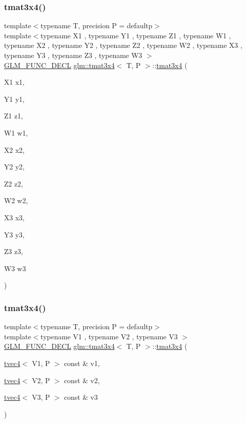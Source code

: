 \subsubsection{\texorpdfstring{tmat3x4()}{tmat3x4()}\hspace{0.1cm}{\footnotesize\ttfamily [8/22]}}
{\footnotesize\ttfamily template$<$typename T, precision P = defaultp$>$ \\
template$<$typename X1 , typename Y1 , typename Z1 , typename W1 , typename X2 , typename Y2 , typename Z2 , typename W2 , typename X3 , typename Y3 , typename Z3 , typename W3 $>$ \\
\mbox{\hyperlink{setup_8hpp_ab2d052de21a70539923e9bcbf6e83a51}{G\+L\+M\+\_\+\+F\+U\+N\+C\+\_\+\+D\+E\+CL}} \mbox{\hyperlink{structglm_1_1tmat3x4}{glm\+::tmat3x4}}$<$ T, P $>$\+::\mbox{\hyperlink{structglm_1_1tmat3x4}{tmat3x4}} (\begin{DoxyParamCaption}\item[{X1}]{x1,  }\item[{Y1}]{y1,  }\item[{Z1}]{z1,  }\item[{W1}]{w1,  }\item[{X2}]{x2,  }\item[{Y2}]{y2,  }\item[{Z2}]{z2,  }\item[{W2}]{w2,  }\item[{X3}]{x3,  }\item[{Y3}]{y3,  }\item[{Z3}]{z3,  }\item[{W3}]{w3 }\end{DoxyParamCaption})}

\mbox{\label{structglm_1_1tmat3x4_a79898618d22d01dd865e88d61aaf9016}} 
\subsubsection{\texorpdfstring{tmat3x4()}{tmat3x4()}\hspace{0.1cm}{\footnotesize\ttfamily [9/22]}}
{\footnotesize\ttfamily template$<$typename T, precision P = defaultp$>$ \\
template$<$typename V1 , typename V2 , typename V3 $>$ \\
\mbox{\hyperlink{setup_8hpp_ab2d052de21a70539923e9bcbf6e83a51}{G\+L\+M\+\_\+\+F\+U\+N\+C\+\_\+\+D\+E\+CL}} \mbox{\hyperlink{structglm_1_1tmat3x4}{glm\+::tmat3x4}}$<$ T, P $>$\+::\mbox{\hyperlink{structglm_1_1tmat3x4}{tmat3x4}} (\begin{DoxyParamCaption}\item[{\mbox{\hyperlink{structglm_1_1tvec4}{tvec4}}$<$ V1, P $>$ const \&}]{v1,  }\item[{\mbox{\hyperlink{structglm_1_1tvec4}{tvec4}}$<$ V2, P $>$ const \&}]{v2,  }\item[{\mbox{\hyperlink{structglm_1_1tvec4}{tvec4}}$<$ V3, P $>$ const \&}]{v3 }\end{DoxyParamCaption})}

